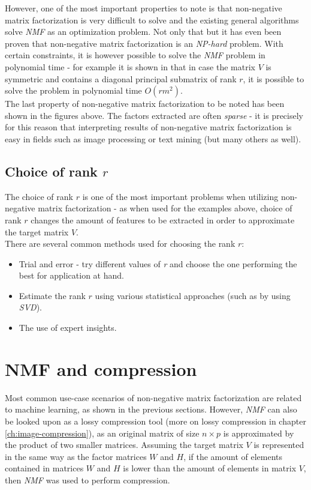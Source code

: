 \documentclass[thesis=M,english]{FITthesis}[2012/10/20]
\begin{document}
However, one of the most important properties to note is that non-negative matrix
factorization is very difficult to solve and the existing general algorithms
solve \emph{NMF} as an optimization problem. Not only that but it has even been
proven that non-negative matrix factorization is an \emph{NP-hard} problem.\cite{nmf-nphard}
With certain constraints, it is however possible to solve the \emph{NMF} problem
in polynomial time - for example it is shown in \cite{nmf-poly} that in case the
matrix $V$ is symmetric and contains a diagonal principal submatrix of rank $r$,
it is possible to solve the problem in polynomial time $O(rm^{2})$.
\\

The last property of non-negative matrix factorization to be noted has been
shown in the figures above. The factors extracted are often \emph{sparse} - it is
precisely for this reason that interpreting results of non-negative matrix
factorization is easy in fields such as image processing or text mining (but many
others as well).\cite{nmf-whyhow}

\subsection{Choice of rank $r$}
The choice of rank $r$ is one of the most important problems when utilizing non-negative
matrix factorization - as when used for the examples above, choice of rank $r$
changes the amount of features to be extracted in order to approximate the target
matrix $V$.
\\

There are several common methods used for choosing the rank $r$:
\begin{itemize}
  \item Trial and error - try different values of \emph{r} and choose the one
        performing the best for application at hand.
  \item Estimate the rank $r$ using various statistical approaches (such as by
        using \emph{SVD}).
  \item The use of expert insights.
\end{itemize}\cite{nmf-whyhow}


\section{NMF and compression}
Most common use-case scenarios of non-negative matrix factorization are
related to machine learning, as shown in the previous sections. However,
\emph{NMF} can also be looked upon as a lossy compression tool (more
on lossy compression in chapter \ref{ch:image-compression}), as an
original matrix of size $n \times p$ is approximated by the product
of two smaller matrices. Assuming the target matrix $V$ is represented
in the same way as the factor matrices $W$ and $H$, if the amount
of elements contained in matrices $W$ and $H$ is lower than the amount of
elements in matrix $V$, then \emph{NMF} was used to perform compression.
\\
\end{document}
